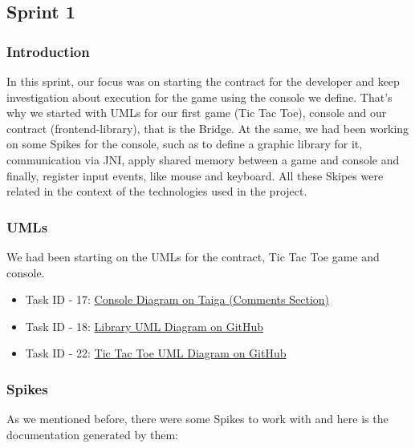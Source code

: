 \subsection{Sprint 1}

\subsubsection{Introduction}

In this sprint, our focus was on starting the contract for the developer and 
keep investigation about execution for the game using the console we define.
That's why we started with UMLs for our first game (Tic Tac Toe), console and
our contract (frontend-library), that is the Bridge.
At the same, we had been working on some Spikes for the console, such as to
define a graphic library for it, communication via JNI, apply shared memory 
between a game and console and finally, register input events, like mouse and keyboard.
All these Skipes were related in the context of the technologies used in the project.

\subsubsection{UMLs}

We had been starting on the UMLs for the contract, Tic Tac Toe game and console.

\begin{itemize}
    \item Task ID - 17: \href{https://tree.taiga.io/project/joseluis-teran-coffeetime/us/17?milestone=392128}{Console Diagram on Taiga (Comments Section)}
    \item Task ID - 18: \href{https://github.com/Pending-Name-21/arquitecture/pull/2}{Library UML Diagram on GitHub}
    \item Task ID - 22: \href{https://github.com/Pending-Name-21/arquitecture/pull/3}{Tic Tac Toe UML Diagram on GitHub}
\end{itemize}

\subsubsection{Spikes}

As we mentioned before, there were some Spikes to work with and here is the documentation generated by them:

